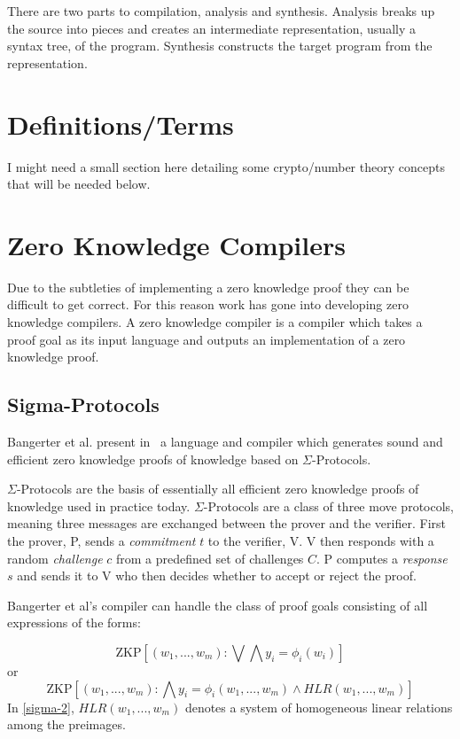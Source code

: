 \documentclass{sig-alternate}
\begin{document}
	There are two parts to compilation, analysis and synthesis. Analysis breaks
	up the source into pieces and creates an intermediate representation, usually
	a syntax tree, of the program. Synthesis constructs the target program from
    the representation.
    
\section{Definitions/Terms}
	I might need a small section here detailing some crypto/number theory
	concepts that will be needed below.
    
    

\section{Zero Knowledge Compilers}
	Due to the subtleties of implementing a zero knowledge proof they
	can be difficult to get correct. For this reason work has gone into
	developing zero knowledge compilers. A zero knowledge compiler is a
	compiler which takes a proof goal as its input language
	and outputs an implementation of a zero knowledge proof.

	\subsection{Sigma-Protocols}
		Bangerter et al. present in~\cite{Sigma:2009} a language and compiler
		which generates sound and efficient zero knowledge proofs of knowledge
		based on $\Sigma$-Protocols.	
	
		$\Sigma$-Protocols are the basis of essentially all efficient zero knowledge
		proofs of knowledge used in practice today. $\Sigma$-Protocols are a class of
		three move protocols, meaning three messages are exchanged between the prover
		and the verifier. First the prover, P, sends a \textit{commitment} $t$ to the
		verifier, V. V then responds with a random \textit{challenge} $c$ from a 
		predefined set of challenges $C$. P computes a \textit{response} $s$ and sends
		it to V who then decides whether to accept or reject the proof.
		
		Bangerter et al's compiler can handle the class of proof goals consisting of
		all expressions of the forms:
		
		\begin{equation}\label{sigma-1}
		\text{ZKP}[(w_{1},...,w_{m}):\bigvee\bigwedge y_{i} = \phi_{i}(w_{i})]
		\end{equation}
		or
		\begin{equation}\label{sigma-2}
		\text{ZKP}[(w_{1},...,w_{m}):\bigwedge y_{i} = \phi_{i}(w_{1},...,w_{m})\land HLR(w_{1},...,w_{m})]
		\end{equation}
		In \eqref{sigma-2}, $HLR(w_{1},...,w_{m})$ denotes a system of homogeneous linear
		relations among the preimages.
		
\end{document}
